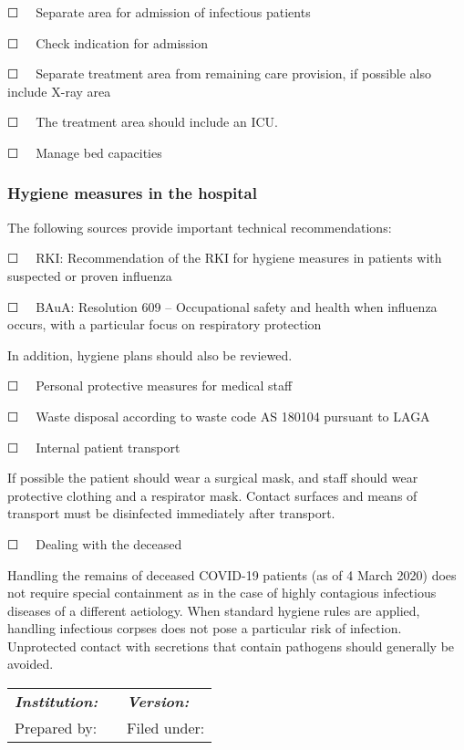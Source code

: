 \documentclass{article}
\begin{document}
☐   Separate area for admission of infectious patients


☐   Check indication for admission 


☐   Separate treatment area from remaining care provision, if possible also include X-ray area 


☐   The treatment area should include an ICU. 


☐   Manage bed capacities 


\subsubsection{Hygiene measures in the hospital }\label{H9502955}



The following sources provide important technical recommendations:


☐   RKI: Recommendation of the RKI for hygiene measures in patients with suspected or proven influenza


☐   BAuA: Resolution 609 – Occupational safety and health when influenza occurs, with a particular focus on respiratory protection 


In addition, hygiene plans should also be reviewed.


☐   Personal protective measures for medical staff


☐   Waste disposal according to waste code AS 180104 pursuant to LAGA 


☐   Internal patient transport


If possible the patient should wear a surgical mask, and staff should wear protective clothing and a respirator mask. Contact surfaces and means of transport must be disinfected immediately after transport.


☐   Dealing with the deceased 


Handling the remains of deceased COVID-19 patients (as of 4 March 2020) does not require special containment as in the case of highly contagious infectious diseases of a different aetiology. When standard hygiene rules are applied, handling infectious corpses does not pose a particular risk of infection. Unprotected contact with secretions that contain pathogens should generally be avoided.


\begin{tabu} to \textwidth { |X|X|X| }
\hline



\emph{\textbf{Institution:}} &  & \emph{\textbf{Version:}}
 \\


Prepared by: &  & Filed under:
 \\
\hline

\end{tabu}

 


 
\end{document}
